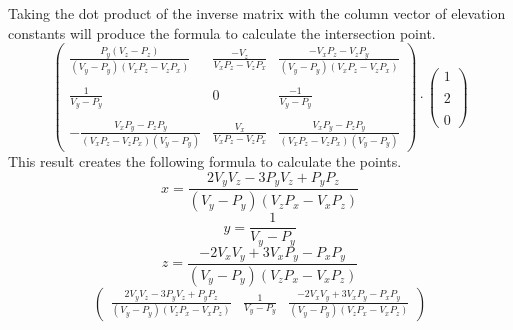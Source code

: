 \documentclass[a4paper, 12pt]{article}
\begin{document}
Taking the dot product of the inverse matrix with the column vector of elevation constants will produce the formula to calculate the intersection point.
$$
\begin{pmatrix}
\frac{P_y(V_z - P_z)}{(V_y-P_y)(V_xP_z-V_zP_x)} & \frac{-V_z}{V_xP_z-V_zP_x} & \frac{-V_xP_z - V_zP_y}{(V_y-P_y)(V_xP_z-V_zP_x)} \\\\
\frac{1}{V_y-P_y} & 0 & \frac{-1}{V_y-P_y} \\\\
-\frac{V_xP_y - P_zP_y}{(V_xP_z-V_zP_x)(V_y-P_y)} & \frac{V_x}{V_xP_z-V_zP_x} & \frac{V_xP_y - P_zP_y}{(V_xP_z-V_zP_x)(V_y-P_y)}
\end{pmatrix}
\cdot
\begin{pmatrix}
1 \\\\ 2 \\\\ 0
\end{pmatrix}
$$
This result creates the following formula to calculate the points.
$$x = \frac{2V_yV_z - 3P_yV_z + P_yP_z}{(V_y-P_y)(V_zP_x-V_xP_z)}$$
$$y = \frac{1}{V_y-P_y}$$
$$z = \frac{-2V_xV_y + 3V_xP_y - P_xP_y}{(V_y-P_y)(V_zP_x-V_xP_z)}$$
$$
\begin{pmatrix}
\frac{2V_yV_z - 3P_yV_z + P_yP_z}{(V_y-P_y)(V_zP_x-V_xP_z)} &
\frac{1}{V_y-P_y} &
\frac{-2V_xV_y + 3V_xP_y - P_xP_y}{(V_y-P_y)(V_zP_x-V_xP_z)}
\end{pmatrix}
$$
\end{document}
